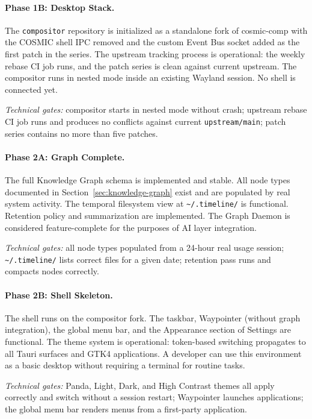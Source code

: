 \paragraph{Phase 1B: Desktop Stack.}
The \texttt{compositor} repository is initialized as a standalone fork of
cosmic-comp with the COSMIC shell IPC removed and the custom Event Bus socket
added as the first patch in the series. The upstream tracking process is
operational: the weekly rebase CI job runs, and the patch series is clean
against current upstream. The compositor runs in nested mode inside an existing
Wayland session. No shell is connected yet.

\emph{Technical gates:} compositor starts in nested mode without crash;
upstream rebase CI job runs and produces no conflicts against current
\texttt{upstream/main}; patch series contains no more than five patches.

\paragraph{Phase 2A: Graph Complete.}
The full Knowledge Graph schema is implemented and stable. All node types
documented in Section~\ref{sec:knowledge-graph} exist and are populated by
real system activity. The temporal filesystem view at
\texttt{\textasciitilde/.timeline/} is functional. Retention policy and
summarization are implemented. The Graph Daemon is considered feature-complete
for the purposes of AI layer integration.

\emph{Technical gates:} all node types populated from a 24-hour real usage
session; \texttt{\textasciitilde/.timeline/} lists correct files for a
given date; retention pass runs and compacts nodes correctly.

\paragraph{Phase 2B: Shell Skeleton.}
The shell runs on the compositor fork. The taskbar, Waypointer (without graph
integration), the global menu bar, and the Appearance section of Settings are
functional. The theme system is operational: token-based switching propagates
to all Tauri surfaces and GTK4 applications. A developer can use this
environment as a basic desktop without requiring a terminal for routine tasks.

\emph{Technical gates:} Panda, Light, Dark, and High Contrast themes all
apply correctly and switch without a session restart; Waypointer launches
applications; the global menu bar renders menus from a first-party application.

